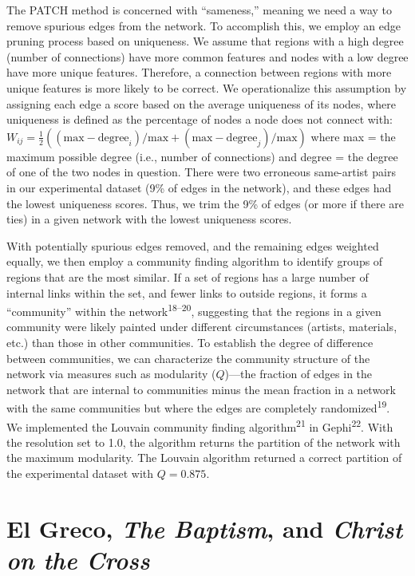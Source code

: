 \documentclass[11pt]{article}
\begin{document}
The PATCH method is concerned with ``sameness,'' meaning we need a way
to remove spurious edges from the network. To accomplish this, we employ
an edge pruning process based on uniqueness. We assume that regions with
a high degree (number of connections) have more common features and
nodes with a low degree have more unique features. Therefore, a
connection between regions with more unique features is more likely to
be correct. We operationalize this assumption by assigning each edge a
score based on the average uniqueness of its nodes, where uniqueness is
defined as the percentage of nodes a node does not connect with:
$W_{ij} = \frac{1}{2}((\text{max} - \text{degree}_{i})/\text{max} + (\text{max} -
\text{degree}_{j})/\text{max})$ where max = the maximum possible degree
(i.e., number of connections) and degree = the degree
of one of the two nodes in question. There were two erroneous
same-artist pairs in our experimental dataset (9\% of edges in the
network), and these edges had the lowest uniqueness scores. Thus, we
trim the 9\% of edges (or more if there are ties) in a given network
with the lowest uniqueness scores.

With potentially spurious edges removed, and the remaining edges
weighted equally, we then employ a community finding algorithm to
identify groups of regions that are the most similar. If a set of
regions has a large number of internal links within the set, and fewer
links to outside regions, it forms a ``community'' within the
network\textsuperscript{18--20}, suggesting that the regions in a given
community were likely painted under different circumstances (artists,
materials, etc.) than those in other communities. To establish the
degree of difference between communities, we can characterize the
community structure of the network via measures such as modularity
($Q$)---the fraction of edges in the network that are internal to
communities minus the mean fraction in a network with the same
communities but where the edges are completely
randomized\textsuperscript{19}. We implemented the Louvain community
finding algorithm\textsuperscript{21} in Gephi\textsuperscript{22}.
With the resolution set to 1.0, the algorithm returns the partition of
the network with the maximum modularity. The Louvain algorithm returned
a correct partition of the experimental dataset with $Q=0.875$.

\section*{El Greco, \emph{The Baptism}, and \emph{Christ on the Cross}}
\end{document}
